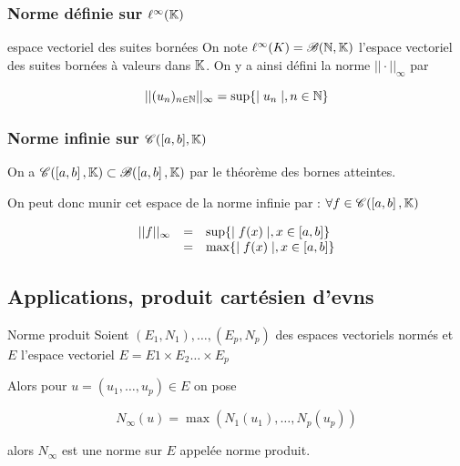 \subsubsection{Norme définie sur \texorpdfstring{$\ell^\infty(\mathbb{K})$}{l infinie (K)}}

\begin{definition}{espace vectoriel des suites bornées}{}
    On note $\ell^\infty(K) = \mathscr B(\mathbb{N}, \mathbb{K})$ l'espace vectoriel des suites bornées
    à valeurs dans $\mathbb{K}$. On y a ainsi défini la norme $|| \cdot ||_\infty$ par 

    $$||(u_n)_{n \in \mathbb{N}} ||_\infty = \sup\{\mid u_n \mid, n \in \mathbb{N}\}$$
\end{definition}

\subsubsection{Norme infinie sur \texorpdfstring{$\mathscr C([a, b], \mathbb{K})$}{C([a, b], K)}}

\begin{definition}{}{}
    On a $\mathscr C(\left[a, b\right], \mathbb{K}) \subset \mathscr B(\left[a, b\right], \mathbb{K})$
    par le théorème des bornes atteintes. 

    On peut donc munir cet espace de la norme infinie par : 
    $\forall f \in \mathscr C(\left[a, b\right], \mathbb{K})$

    \[
    \begin{array}{rcl}
        ||f ||_\infty & =& \sup\{\mid f(x) \mid, x \in \left[a, b\right]\} \\
        \space & = & \max\{\mid f(x) \mid, x \in \left[a, b\right]\} \\
    \end{array}
    \]


\end{definition}


\subsection{Applications, produit cartésien d'evns}

\begin{theoreme}{Norme produit}{}
    Soient $(E_1, N_1), \dots, (E_p, N_p)$ des espaces vectoriels normés
    et $E$ l'espace vectoriel $E = E1 \times E_2 \dots \times E_p$

    Alors pour $u = (u_1, \dots, u_p) \in E$ on pose 

    $$N_\infty(u) = \max(N_1(u_1), \dots, N_p(u_p))$$

    alors $N_\infty$ est une norme sur $E$ appelée norme produit. 
\end{theoreme}

